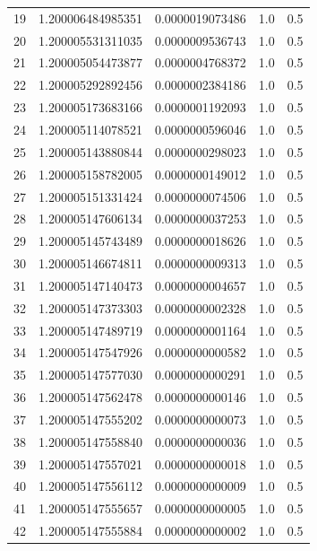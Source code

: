 \documentclass[titlepage,a4paper]{article}
\begin{document}
\begin{center}
\begin{tabular}{| c | l | c | c | c |}
        19      & 1.200006484985351  &  0.0000019073486  &  1.0  &  0.5 \\
        20      & 1.200005531311035  &  0.0000009536743  &  1.0  &  0.5 \\
        21      & 1.200005054473877  &  0.0000004768372  &  1.0  &  0.5 \\
        22      & 1.200005292892456  &  0.0000002384186  &  1.0  &  0.5 \\
        23      & 1.200005173683166  &  0.0000001192093  &  1.0  &  0.5 \\
        24      & 1.200005114078521  &  0.0000000596046  &  1.0  &  0.5 \\
        25      & 1.200005143880844  &  0.0000000298023  &  1.0  &  0.5 \\
        26      & 1.200005158782005  &  0.0000000149012  &  1.0  &  0.5 \\
        27      & 1.200005151331424  &  0.0000000074506  &  1.0  &  0.5 \\
        28      & 1.200005147606134  &  0.0000000037253  &  1.0  &  0.5 \\
        29      & 1.200005145743489  &  0.0000000018626  &  1.0  &  0.5 \\
        30      & 1.200005146674811  &  0.0000000009313  &  1.0  &  0.5 \\
        31      & 1.200005147140473  &  0.0000000004657  &  1.0  &  0.5 \\
        32      & 1.200005147373303  &  0.0000000002328  &  1.0  &  0.5 \\
        33      & 1.200005147489719  &  0.0000000001164  &  1.0  &  0.5 \\
        34      & 1.200005147547926  &  0.0000000000582  &  1.0  &  0.5 \\
        35      & 1.200005147577030  &  0.0000000000291  &  1.0  &  0.5 \\
        36      & 1.200005147562478  &  0.0000000000146  &  1.0  &  0.5 \\
        37      & 1.200005147555202  &  0.0000000000073  &  1.0  &  0.5 \\
        38      & 1.200005147558840  &  0.0000000000036  &  1.0  &  0.5 \\
        39      & 1.200005147557021  &  0.0000000000018  &  1.0  &  0.5 \\
        40      & 1.200005147556112  &  0.0000000000009  &  1.0  &  0.5 \\
        41      & 1.200005147555657  &  0.0000000000005  &  1.0  &  0.5 \\
        42      & 1.200005147555884  &  0.0000000000002  &  1.0  &  0.5 \\
        \hline
    \end{tabular}
\end{center}
\end{document}
